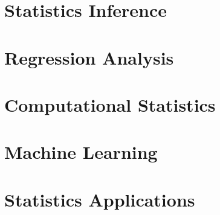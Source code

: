 \documentclass[12pt]{prettybook}
\begin{document}
\part{Statistics Inference}





\part{Regression Analysis}




\part{Computational Statistics}

\part{Machine Learning}




\part{Statistics Applications}



\appendix

\backmatter
\nocite{*}
\printbibliography
\end{document}
